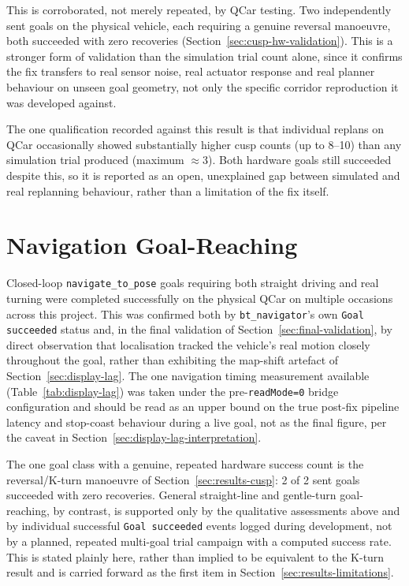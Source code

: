 This is corroborated, not merely repeated, by QCar testing.
Two independently sent goals on the physical vehicle, each requiring
a genuine reversal manoeuvre, both succeeded with zero recoveries
(Section~\ref{sec:cusp-hw-validation}). This is a stronger form of
validation than the simulation trial count alone, since it confirms
the fix transfers to real sensor noise, real actuator response and
real planner behaviour on unseen goal geometry, not only the specific
corridor reproduction it was developed against.

The one qualification recorded against this result is that
individual replans on QCar occasionally showed substantially
higher cusp counts (up to 8--10) than any simulation trial produced
(maximum $\approx$3). Both hardware goals still succeeded despite
this, so it is reported as an open, unexplained gap between simulated
and real replanning behaviour, rather than a limitation of the fix
itself.

\section{Navigation Goal-Reaching}
\label{sec:results-goal-reaching}

Closed-loop \texttt{navigate\_to\_pose} goals requiring both straight
driving and real turning were completed successfully on the physical
QCar on multiple occasions across this project. This was confirmed
both by \texttt{bt\_navigator}'s own \texttt{Goal succeeded} status
and, in the final validation of Section~\ref{sec:final-validation}, by
direct observation that localisation tracked the
vehicle's real motion closely throughout the goal, rather than
exhibiting the map-shift artefact of Section~\ref{sec:display-lag}. The one
navigation timing measurement available (Table~\ref{tab:display-lag})
was taken under the pre-\texttt{readMode=0} bridge configuration and
should be read as an upper bound on the true post-fix pipeline
latency and stop-coast behaviour during a live goal, not as the final
figure, per the caveat in Section~\ref{sec:display-lag-interpretation}.

The one goal class with a genuine, repeated hardware success count is
the reversal/K-turn manoeuvre of Section~\ref{sec:results-cusp}: 2 of
2 sent goals succeeded with zero recoveries. General straight-line and
gentle-turn goal-reaching, by contrast, is supported only by the
qualitative assessments above and by individual successful
\texttt{Goal succeeded} events logged during development, not by a
planned, repeated multi-goal trial campaign with a computed success
rate. This is stated plainly here, rather than implied to be
equivalent to the K-turn result and is carried forward as the first
item in Section~\ref{sec:results-limitations}.

